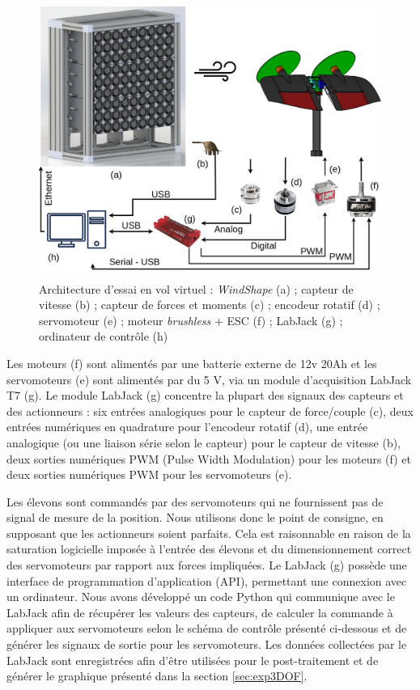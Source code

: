 \begin{figure}[!ht]
    \includegraphics[width=0.9\columnwidth]{figures/maquette-min.png}
    \caption{Architecture d'essai en vol virtuel : \textit{WindShape} (a) ; capteur de vitesse (b) ; capteur de forces et moments (c) ; encodeur rotatif (d) ; servomoteur (e) ; moteur \textit{brushless} + ESC (f) ; LabJack (g) ; ordinateur de contrôle (h)}
    \label{fig:archi}
\end{figure}

Les moteurs (f) sont alimentés par une batterie externe de 12v 20Ah et les servomoteurs (e) sont alimentés par du 5 V, via un module d'acquisition LabJack T7 \cite[]{LabJack} (g). Le module LabJack (g) concentre la plupart des signaux des capteurs et des actionneurs : six entrées analogiques pour le capteur de force/couple (c), deux entrées numériques en quadrature pour l'encodeur rotatif (d), une entrée analogique (ou une liaison série selon le capteur) pour le capteur de vitesse (b), deux sorties numériques PWM (Pulse Width Modulation) pour les moteurs (f) et deux sorties numériques PWM pour les servomoteurs (e). 

Les élevons sont commandés par des servomoteurs qui ne fournissent pas de signal de mesure de la position. Nous utilisons donc le point de consigne, en supposant que les actionneurs soient parfaits. Cela est raisonnable en raison de la saturation logicielle imposée à l'entrée des élevons et du dimensionnement correct des servomoteurs par rapport aux forces impliquées. 
Le LabJack (g) possède une interface de programmation d'application (API), permettant une connexion avec un ordinateur. Nous avons développé un code Python qui communique avec le LabJack afin de récupérer les valeurs des capteurs, de calculer la commande à appliquer aux servomoteurs selon le schéma de contrôle présenté ci-dessous et de générer les signaux de sortie pour les servomoteurs. Les données collectées par le LabJack sont enregistrées afin d'être utilisées pour le post-traitement et de générer le graphique présenté dans la section \ref{sec:exp3DOF}. 


